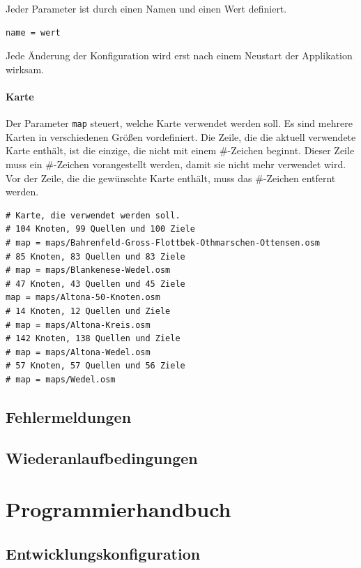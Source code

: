 \documentclass[a4paper,10pt]{scrreprt}
\begin{document}
Jeder Parameter ist durch einen Namen und einen Wert definiert.

\begin{lstlisting}
name = wert
\end{lstlisting}

Jede Änderung der Konfiguration wird erst nach einem Neustart der Applikation wirksam.

\subsubsection{Karte}
\label{sec:konfiguration-karte}

Der Parameter \texttt{map} steuert, welche Karte verwendet werden soll.
Es sind mehrere Karten in verschiedenen Größen vordefiniert.
Die Zeile, die die aktuell verwendete Karte enthält, ist die einzige, die nicht mit einem \#-Zeichen beginnt.
Dieser Zeile muss ein \#-Zeichen vorangestellt werden, damit sie nicht mehr verwendet wird.
Vor der Zeile, die die gewünschte Karte enthält, muss das \#-Zeichen entfernt werden.

\begin{lstlisting}
# Karte, die verwendet werden soll.
# 104 Knoten, 99 Quellen und 100 Ziele
# map = maps/Bahrenfeld-Gross-Flottbek-Othmarschen-Ottensen.osm
# 85 Knoten, 83 Quellen und 83 Ziele
# map = maps/Blankenese-Wedel.osm
# 47 Knoten, 43 Quellen und 45 Ziele
map = maps/Altona-50-Knoten.osm
# 14 Knoten, 12 Quellen und Ziele
# map = maps/Altona-Kreis.osm
# 142 Knoten, 138 Quellen und Ziele
# map = maps/Altona-Wedel.osm
# 57 Knoten, 57 Quellen und 56 Ziele
# map = maps/Wedel.osm
\end{lstlisting}


\section{Fehlermeldungen}
\label{sec:fehlermeldungen}

\section{Wiederanlaufbedingungen}
\label{sec:wiederanlaufbedingungen}

\chapter{Programmierhandbuch}
\label{chap:Programmierhandbuch}

\section{Entwicklungskonfiguration}
\label{sec:entwicklungskonfiguration}
\end{document}
